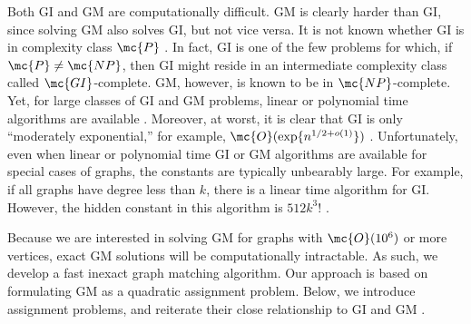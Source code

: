 \documentclass[10pt,journal,cspaper,compsoc]{IEEEtran}
\newcommand{\PmcP}{P \in \mc{P}}
\begin{document}

Both GI and GM are computationally difficult. GM is clearly harder than GI, since solving GM also solves GI, but not vice versa. It is not known whether GI is in complexity class $\mc{P}$ \cite{Fortin1996}.  In fact, GI is one of the few problems for which, if $\mc{P} \neq \mc{NP}$, then GI might reside in an intermediate complexity class called $\mc{GI}$-complete.  GM, however, is known to be in $\mc{NP}$-complete.    
Yet, for large classes of GI and GM problems, linear or polynomial time algorithms are available \cite{Babai1980}.  Moreover, at worst, it is clear that GI is only ``moderately exponential,'' for example, $\mc{O}(\exp\{n^{1/2 + o(1)}\})$ \cite{Babai1981}.  Unfortunately, even when linear or polynomial time GI or GM algorithms are available for special cases of graphs, the constants are typically unbearably large.  For example, if all graphs have degree less than $k$, there is a linear time algorithm for GI.  However, the hidden constant in this algorithm is $512k^3!$ \cite{Chen1994}.  

Because we are interested in solving GM for graphs with $\mc{O}(10^6)$ or more vertices, exact GM solutions will be computationally intractable. As such, we develop a fast inexact graph matching algorithm.   Our approach is based on formulating GM as a quadratic assignment problem.  Below, we introduce assignment problems, and reiterate their close relationship to GI and GM \cite{Burkard2009}.

\end{document}
